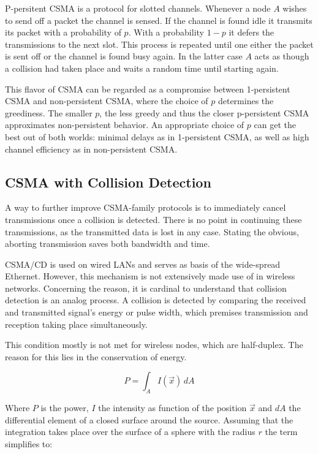 P-persitent CSMA is a protocol for slotted channels. Whenever a node $A$ wishes to send off a packet the channel is sensed. If the channel is found idle it transmits its packet with a probability of $p$. With a probability $1-p$ it defers the transmissions to the next slot. This process is repeated until one either the packet is sent off or the channel is found busy again. In the latter case $A$ acts as though a collision had taken place and waits a random time until starting again.

\bigskip

This flavor of CSMA can be regarded as a compromise between 1-persistent CSMA and non-persistent CSMA, where the choice of $p$ determines the greediness. The smaller $p$, the less greedy and thus the closer p-persistent CSMA approximates non-persistent behavior. An appropriate choice of $p$ can get the best out of both worlds: minimal delays as in 1-persistent CSMA, as well as high channel efficiency as in non-persistent CSMA.

\subsection{CSMA with Collision Detection}

A way to further improve CSMA-family protocols is to immediately cancel transmissions once a collision is detected. There is no point in continuing these transmissions, as the transmitted data is lost in any case. Stating the obvious, aborting transmission saves both bandwidth and time. 

\bigskip

CSMA/CD is used on wired LANs and serves as basis of the wide-spread Ethernet. However, this mechanism is not extensively made use of in wireless networks. Concerning the reason, it is cardinal to understand that collision detection is an analog process. A collision is detected by comparing the received and transmitted signal's energy or pulse width, which premises transmission and reception taking place simultaneously. 

\bigskip

This condition mostly is not met for wireless nodes, which are half-duplex. The reason for this lies in the conservation of energy.

\begin{equation}
	P = \int_{A} I(\vec{x}) \, dA
\end{equation}

Where $P$ is the power, $I$ the intensity as function of the position $\vec{x}$ and $dA$ the differential element of a closed surface around the source. Assuming that the integration takes place over the surface of a sphere with the radius $r$ the term simplifies to:

